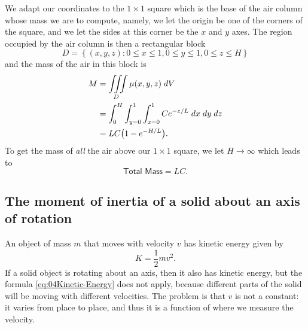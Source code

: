 We adapt our coordinates to the $1\times1$ square which is the
base of the air column whose mass we are to compute, namely, we
let the origin be one of the corners of the square, and we let the sides at
this corner be the $x$ and $y$ axes.  The region occupied by 
the air column is then a rectangular block
\[
D = \left\{ (x, y, z) : 0\le x\le 1, 0\le y\le 1, 0\le z\le H \right\}
\]
and the mass of the air in this block is
\begin{align*}
  M &= \iiint\limits_D \mu(x, y, z) \; dV \\
  &= \int_0^H \int_{y=0}^1 \int_{x=0}^1 C e^{-z/L}\; dx\; dy\; dz \\
  &= LC\bigl(1-e^{-H/L}\bigr).
\end{align*}
To get the mass of \textit{all} the air above our $1\times1$ square, we let
$H\to\infty$ which leads to
\[
\textsf{Total Mass} = LC.
\]


\subsection{The moment of inertia of a solid about an axis of rotation} 
\label{sec:moment-of-inertia}
An object of mass $m$ that moves with velocity $v$ has kinetic energy
given by 
\begin{equation}\label{eq:04Kinetic-Energy}
  K=\frac12mv^2.
\end{equation}
If a solid object is rotating about an axis, then it also has kinetic
energy, but the formula \eqref{eq:04Kinetic-Energy} does not apply, because
different parts of the solid will be moving with different velocities.  The
problem is that $v$ is not a constant: it varies from place to place, and
thus it is a function of where we measure the velocity.

